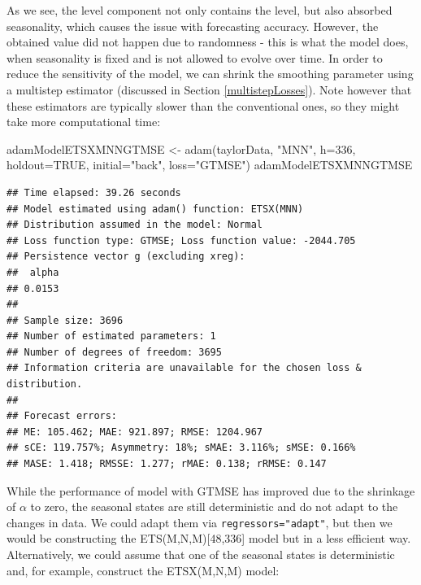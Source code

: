 \documentclass[
]{book}
\newenvironment{Shaded}{\begin{snugshade}}{\end{snugshade}}
\newcommand{\AttributeTok}[1]{\textcolor[rgb]{0.77,0.63,0.00}{#1}}
\newcommand{\ConstantTok}[1]{\textcolor[rgb]{0.00,0.00,0.00}{#1}}
\newcommand{\DecValTok}[1]{\textcolor[rgb]{0.00,0.00,0.81}{#1}}
\newcommand{\FunctionTok}[1]{\textcolor[rgb]{0.00,0.00,0.00}{#1}}
\newcommand{\NormalTok}[1]{#1}
\newcommand{\OtherTok}[1]{\textcolor[rgb]{0.56,0.35,0.01}{#1}}
\newcommand{\StringTok}[1]{\textcolor[rgb]{0.31,0.60,0.02}{#1}}
\theoremstyle{definition}
\theoremstyle{definition}
\theoremstyle{definition}
\theoremstyle{definition}
\theoremstyle{remark}
\begin{document}
As we see, the level component not only contains the level, but also absorbed seasonality, which causes the issue with forecasting accuracy. However, the obtained value did not happen due to randomness - this is what the model does, when seasonality is fixed and is not allowed to evolve over time. In order to reduce the sensitivity of the model, we can shrink the smoothing parameter using a multistep estimator (discussed in Section \ref{multistepLosses}). Note however that these estimators are typically slower than the conventional ones, so they might take more computational time:

\begin{Shaded}
\begin{Highlighting}[]
\NormalTok{adamModelETSXMNNGTMSE }\OtherTok{\textless{}{-}} \FunctionTok{adam}\NormalTok{(taylorData, }\StringTok{"MNN"}\NormalTok{,}
                              \AttributeTok{h=}\DecValTok{336}\NormalTok{, }\AttributeTok{holdout=}\ConstantTok{TRUE}\NormalTok{,}
                              \AttributeTok{initial=}\StringTok{"back"}\NormalTok{, }\AttributeTok{loss=}\StringTok{"GTMSE"}\NormalTok{)}
\NormalTok{adamModelETSXMNNGTMSE}
\end{Highlighting}
\end{Shaded}

\begin{verbatim}
## Time elapsed: 39.26 seconds
## Model estimated using adam() function: ETSX(MNN)
## Distribution assumed in the model: Normal
## Loss function type: GTMSE; Loss function value: -2044.705
## Persistence vector g (excluding xreg):
##  alpha 
## 0.0153 
## 
## Sample size: 3696
## Number of estimated parameters: 1
## Number of degrees of freedom: 3695
## Information criteria are unavailable for the chosen loss & distribution.
## 
## Forecast errors:
## ME: 105.462; MAE: 921.897; RMSE: 1204.967
## sCE: 119.757%; Asymmetry: 18%; sMAE: 3.116%; sMSE: 0.166%
## MASE: 1.418; RMSSE: 1.277; rMAE: 0.138; rRMSE: 0.147
\end{verbatim}

While the performance of model with GTMSE has improved due to the shrinkage of \(\alpha\) to zero, the seasonal states are still deterministic and do not adapt to the changes in data. We could adapt them via \texttt{regressors="adapt"}, but then we would be constructing the ETS(M,N,M){[}48,336{]} model but in a less efficient way. Alternatively, we could assume that one of the seasonal states is deterministic and, for example, construct the ETSX(M,N,M) model:
\end{document}
